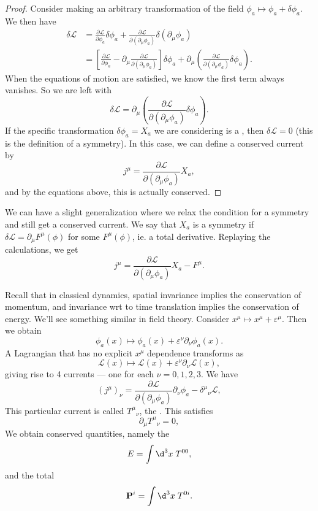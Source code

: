 \documentclass[a4paper]{article}
\begin{document}
\begin{proof}
  Consider making an arbitrary transformation of the field $\phi_a \mapsto \phi_a + \delta \phi_a$. We then have
  \begin{align*}
    \delta \mathcal{L} &= \frac{\partial \mathcal{L}}{\partial \phi_a} \delta \phi_a + \frac{\partial \mathcal{L}}{\partial(\partial_\mu \phi_a)} \delta(\partial_\mu \phi_a)\\
    &= \left[\frac{\partial \mathcal{L}}{\partial \phi_a} - \partial_\mu \frac{\partial \mathcal{L}}{\partial(\partial_\mu \phi_a)}\right] \delta \phi_a + \partial_\mu \left(\frac{\partial \mathcal{L}}{\partial(\partial_\mu \phi_a)} \delta \phi_a\right).
  \end{align*}
  When the equations of motion are satisfied, we know the first term always vanishes. So we are left with
  \[
    \delta \mathcal{L} = \partial_\mu \left(\frac{\partial \mathcal{L}}{\partial(\partial_\mu \phi_a)} \delta \phi_a\right).
  \]
  If the specific transformation $\delta \phi_a = X_a$ we are considering is a , then $\delta\mathcal{L} = 0$ (this is the definition of a symmetry). In this case, we can define a conserved current by
  \[
    j^\mu = \frac{\partial \mathcal{L}}{\partial (\partial_\mu \phi_a)}X_a,
  \]
  and by the equations above, this is actually conserved.
\end{proof}
We can have a slight generalization where we relax the condition for a symmetry and still get a conserved current. We say that $X_a$ is a symmetry if $\delta \mathcal{L} = \partial_\mu F^\mu(\phi)$ for some $F^\mu(\phi)$, ie. a total derivative. Replaying the calculations, we get
\[
  j^\mu = \frac{\partial \mathcal{L}}{\partial (\partial_\mu \phi_a)} X_a - F^\mu.
\]
\begin{eg}
  Recall that in classical dynamics, spatial invariance implies the conservation of momentum, and invariance wrt to time translation implies the conservation of energy. We'll see something similar in field theory. Consider $x^\mu \mapsto x^\mu + \varepsilon^\mu$. Then we obtain
  \[
    \phi_a(x) \mapsto \phi_a(x) + \varepsilon^\nu \partial_\nu \phi_a(x).
  \]
  A Lagrangian that has no explicit $x^\mu$ dependence transforms as
  \[
    \mathcal{L}(x) \mapsto \mathcal{L}(x) + \varepsilon^\nu \partial_\nu \mathcal{L}(x),
  \]
  giving rise to 4 currents --- one for each $\nu = 0, 1, 2, 3$. We have
  \[
    (j^\mu)_\nu = \frac{\partial \mathcal{L}}{\partial (\partial_\mu \phi_a)} \partial_\nu \phi_a - \delta^\mu\!_\nu \mathcal{L},
  \]
  This particular current is called $T^\mu\!_\nu$, the . This satisfies
  \[
    \partial_\mu T^\mu\!_\nu = 0,
  \]
  We obtain conserved quantities, namely the 
  \[
    E = \int \d^3 x\;T^{00},
  \]
  and the total 
  \[
    \mathbf{P}^i = \int \d^3 x\; T^{0i}.
  \]
\end{eg}
\end{document}
